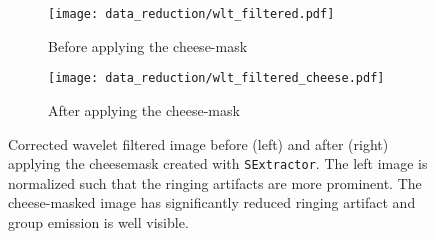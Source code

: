 \begin{figure}[htbp]
    \centering
    \begin{subfigure}[b]{0.48\textwidth}
        \centering
        \texttt{[image: data\_reduction/wlt\_filtered.pdf]}
        \caption{Before applying the cheese-mask}
        \label{fig:wlt_filtered}
    \end{subfigure}
    \hfill
    \begin{subfigure}[b]{0.48\textwidth}
        \centering
        \texttt{[image: data\_reduction/wlt\_filtered\_cheese.pdf]}
        \caption{After applying the cheese-mask}
        \label{fig:wvl_filtered_cheesed}
    \end{subfigure}
    \caption{Corrected wavelet filtered image before (left) and after (right) applying the cheesemask created with \texttt{SExtractor}. The left image is normalized such that the ringing artifacts are more prominent. The cheese-masked image has significantly reduced ringing artifact and group emission is well visible.}
    \label{fig:comparison_wvl_filtered}
\end{figure}




